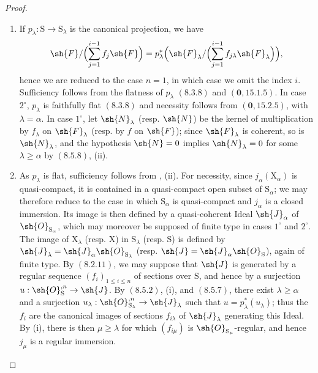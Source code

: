 \begin{proof}
\begin{enumerate}
\item[\rm(i)] If $p_\lambda:\mathrm{S}\to\mathrm{S}_\lambda$ is the canonical projection, we have
\[
  \sh{F}/\Bigl(\sum_{j=1}^{i-1}f_j\sh{F}\Bigr)
  =p_\lambda^*\Bigl(\sh{F}_\lambda/\Bigl(\sum_{j=1}^{i-1}f_{j\lambda}\sh{F}_\lambda\Bigr)\Bigr),
\]
hence we are reduced to the case $n=1$, in which case we omit the index $i$. Sufficiency follows from the flatness of $p_\lambda$ $(8.3.8)$ and $(\mathbf{0},15.1.5)$. In case $2^\circ$, $p_\lambda$ is faithfully flat $(8.3.8)$ and necessity follows from $(\mathbf{0},15.2.5)$, with $\lambda=\alpha$. In case $1^\circ$, let $\sh{N}_\lambda$ (resp. $\sh{N}$) be the kernel of multiplication by $f_\lambda$ on $\sh{F}_\lambda$ (resp. by $f$ on $\sh{F}$); since $\sh{F}_\lambda$ is coherent, so is $\sh{N}_\lambda$, and the hypothesis $\sh{N}=0$ implies $\sh{N}_\lambda=0$ for some $\lambda\geqslant\alpha$ by $(8.5.8)$, (ii).
\item[\rm(ii)] As $p_\lambda$ is flat, sufficiency follows from , (ii). For necessity, since $j_\alpha(\mathrm{X}_\alpha)$ is quasi-compact, it is contained in a quasi-compact open subset of $\mathrm{S}_\alpha$; we may therefore reduce to the case in which $\mathrm{S}_\alpha$ is quasi-compact and $j_\alpha$ is a closed immersion. Its image is then defined by a quasi-coherent Ideal $\sh{J}_\alpha$ of $\sh{O}_{\mathrm{S}_\alpha}$, which may moreover be supposed of finite type in cases $1^\circ$ and $2^\circ$. The image of $\mathrm{X}_\lambda$ (resp. $\mathrm{X}$) in $\mathrm{S}_\lambda$ (resp. $\mathrm{S}$) is defined by $\sh{J}_\lambda=\sh{J}_\alpha\sh{O}_{\mathrm{S}_\lambda}$ (resp. $\sh{J}=\sh{J}_\alpha\sh{O}_\mathrm{S}$), again of finite type. By $(8.2.11)$, we may suppose that $\sh{J}$ is generated by a regular sequence $(f_i)_{1\leqslant i\leqslant n}$ of sections over $\mathrm{S}$, and hence by a surjection $u:\sh{O}_\mathrm{S}^{,n}\to\sh{J}$. By $(8.5.2)$, (i), and $(8.5.7)$, there exist $\lambda\geqslant\alpha$ and a surjection $u_\lambda:\sh{O}_{\mathrm{S}_\lambda}^{,n}\to\sh{J}_\lambda$ such that $u=p_\lambda^*(u_\lambda)$; thus the $f_i$ are the canonical images of sections $f_{i\lambda}$ of $\sh{J}_\lambda$ generating this Ideal. By (i), there is then $\mu\geqslant\lambda$ for which $(f_{i\mu})$ is $\sh{O}_{\mathrm{S}_\mu}$-regular, and hence $j_\mu$ is a regular immersion.
\end{enumerate}
\end{proof}

